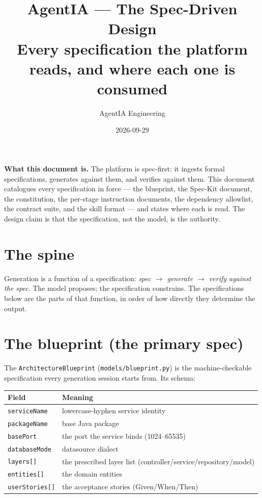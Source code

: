 \documentclass[11pt,a4paper]{article}
\title{\vspace{-1.4cm}\textbf{AgentIA --- The Spec-Driven Design}\\[0.25cm]
\large Every specification the platform reads, and where each one is consumed}
\author{AgentIA Engineering}
\date{2026-09-29}
\begin{document}
\maketitle
\thispagestyle{fancy}

\begin{notebox}
\textbf{What this document is.} The platform is spec-first: it ingests formal
specifications, generates against them, and verifies against them. This document
catalogues every specification in force --- the blueprint, the Spec-Kit document,
the constitution, the per-stage instruction documents, the dependency allowlist, the
contract suite, and the skill format --- and states where each is read. The design
claim is that the specification, not the model, is the authority.
\end{notebox}

\tableofcontents
\vspace{0.4cm}

\section{The spine}

Generation is a function of a specification: \emph{spec $\rightarrow$ generate
$\rightarrow$ verify against the spec}. The model proposes; the specification
constrains. The specifications below are the parts of that function, in order of how
directly they determine the output.

\section{The blueprint (the primary spec)}

The \texttt{ArchitectureBlueprint} (\texttt{models/blueprint.py}) is the machine-checkable
specification every generation session starts from. Its schema:

\begin{center}
\begin{longtable}{@{}p{}p{}@{}}
\toprule
\textbf{Field} & \textbf{Meaning} \\
\midrule
\texttt{serviceName} & lowercase-hyphen service identity \\
\texttt{packageName} & base Java package \\
\texttt{basePort} & the port the service binds (1024--65535) \\
\texttt{databaseMode} & datasource dialect \\
\texttt{layers[]} & the prescribed layer list (controller/service/repository/model) \\
\texttt{entities[]} & the domain entities \\
\texttt{userStories[]} & the acceptance stories (Given/When/Then) \\
\bottomrule
\end{longtable}
\end{center}
\end{document}
